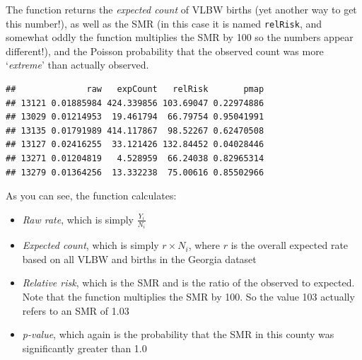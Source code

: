 \documentclass[
]{book}
\newenvironment{Shaded}{\begin{snugshade}}{\end{snugshade}}
\newcommand{\AttributeTok}[1]{\textcolor[rgb]{0.13,0.29,0.53}{#1}}
\newcommand{\CommentTok}[1]{\textcolor[rgb]{0.56,0.35,0.01}{\textit{#1}}}
\newcommand{\FunctionTok}[1]{\textcolor[rgb]{0.13,0.29,0.53}{\textbf{#1}}}
\newcommand{\NormalTok}[1]{#1}
\newcommand{\OtherTok}[1]{\textcolor[rgb]{0.56,0.35,0.01}{#1}}
\newcommand{\SpecialCharTok}[1]{\textcolor[rgb]{0.81,0.36,0.00}{\textbf{#1}}}
\newcommand{\StringTok}[1]{\textcolor[rgb]{0.31,0.60,0.02}{#1}}
\providecommand{\tightlist}{%
  \setlength{\itemsep}{0pt}\setlength{\parskip}{0pt}}
\begin{document}
The function returns the \emph{expected count} of VLBW births (yet another way to get this number!), as well as the SMR (in this case it is named \texttt{relRisk}, and somewhat oddly the function multiplies the SMR by 100 so the numbers appear different!), and the Poisson probability that the observed count was more `\emph{extreme}' than actually observed.

\begin{Shaded}
\end{Shaded}

\begin{verbatim}
##              raw   expCount   relRisk       pmap
## 13121 0.01885984 424.339856 103.69047 0.22974886
## 13029 0.01214953  19.461794  66.79754 0.95041991
## 13135 0.01791989 414.117867  98.52267 0.62470508
## 13127 0.02416255  33.121426 132.84452 0.04028446
## 13271 0.01204819   4.528959  66.24038 0.82965314
## 13279 0.01364256  13.332238  75.00616 0.85502966
\end{verbatim}

As you can see, the function calculates:

\begin{itemize}
\tightlist
\item
  \emph{Raw rate}, which is simply \(\frac{Y_i}{N_i}\)
\item
  \emph{Expected count}, which is simply \(r\times N_i\), where \(r\) is the overall expected rate based on all VLBW and births in the Georgia dataset
\item
  \emph{Relative risk}, which is the SMR and is the ratio of the observed to expected. Note that the function multiplies the SMR by 100. So the value 103 actually refers to an SMR of 1.03
\item
  \emph{p-value}, which again is the probability that the SMR in this county was significantly greater than 1.0
\end{itemize}
\end{document}
